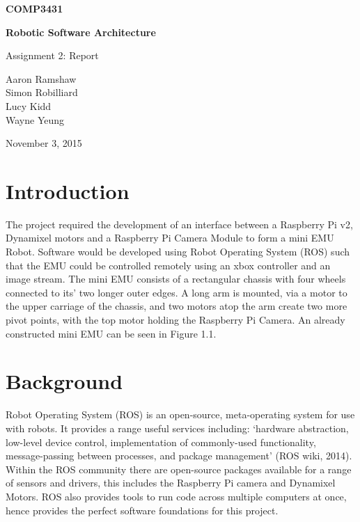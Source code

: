 \documentclass[titlepage,12pt,a4paper]{article}
\begin{document}
\begin{titlepage}
    \begin{center}
        \vspace*{3cm}
        
        \Huge
        \textbf{COMP3431\\}
        \title{}
        \vspace{0.5cm}
        \Huge
        \textbf{Robotic Software Architecture}
        
        \vspace{0.54cm}
        
        \Large
        Assignment 2: Report
        
        \vspace{5cm}

	\normalsize
	Aaron Ramshaw\\
	Simon Robilliard\\
    Lucy Kidd\\
	Wayne Yeung
        
	\vfill
        
        \Large
        November 3, 2015
        
    \end{center}
\end{titlepage}

\pagebreak

\section{Introduction}
The project required the development of an interface between a Raspberry Pi v2, Dynamixel motors and a Raspberry Pi Camera Module to form a mini EMU Robot. Software would be developed using Robot Operating System (ROS) such that the EMU could be controlled remotely using an xbox controller and an image stream. The mini EMU consists of a rectangular chassis with four wheels connected to its’ two longer outer edges. A long arm is mounted, via a motor to the upper carriage of the chassis, and two motors atop the arm create two more pivot points, with the top motor holding the Raspberry Pi Camera. An already constructed mini EMU can be seen in Figure 1.1.

\section{Background}
Robot Operating System (ROS) is an open-source, meta-operating system for use with robots. It provides a range useful services including: ‘hardware abstraction, low-level device control, implementation of commonly-used functionality, message-passing between processes, and package management’ (ROS wiki, 2014). Within the ROS community there are open-source packages available for a range of sensors and drivers, this includes the Raspberry Pi camera and Dynamixel Motors. ROS also provides tools to run code across multiple computers at once, hence provides the perfect software foundations for this project.\\
\end{document}
